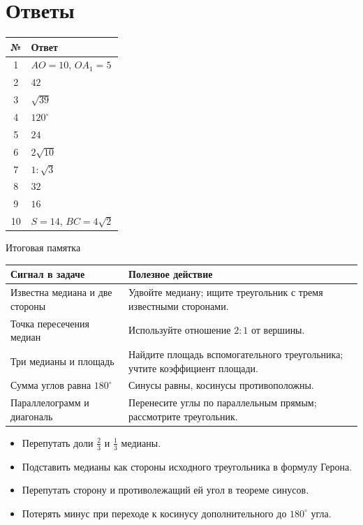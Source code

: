 \documentclass[a4paper,12pt]{article}
\newcommand{\topic}[1]{\par\medskip{\color{darkaccent}\large #1}\par\smallskip}
\begin{document}
\section*{Ответы}
\begin{center}
\renewcommand{\arraystretch}{1.35}
\begin{tabular}{@{}cl@{}}
\toprule
№ & Ответ\\\midrule
1 & $AO=10$, $OA_1=5$\\
2 & $42$\\
3 & $\sqrt{39}$\\
4 & $120^\circ$\\
5 & $24$\\
6 & $2\sqrt{10}$\\
7 & $1:\sqrt3$\\
8 & $32$\\
9 & $16$\\
10 & $S=14$, $BC=4\sqrt2$\\\bottomrule
\end{tabular}
\end{center}
\vspace{5mm}
\begin{center}{\large\color{darkaccent} Итоговая памятка}\end{center}
\renewcommand{\arraystretch}{1.3}
\begin{tabularx}{\linewidth}{@{}p{.43\linewidth}X@{}}
\toprule
Сигнал в задаче & Полезное действие\\\midrule
Известна медиана и две стороны & Удвойте медиану; ищите треугольник с тремя известными сторонами.\\
Точка пересечения медиан & Используйте отношение $2:1$ от вершины.\\
Три медианы и площадь & Найдите площадь вспомогательного треугольника; учтите коэффициент площади.\\
Сумма углов равна $180^\circ$ & Синусы равны, косинусы противоположны.\\
Параллелограмм и диагональ & Перенесите углы по параллельным прямым; рассмотрите треугольник.\\\bottomrule
\end{tabularx}
\topic{Типичные ошибки}
\begin{itemize}
\item Перепутать доли $\frac23$ и $\frac13$ медианы.
\item Подставить медианы как стороны исходного треугольника в формулу Герона.
\item Перепутать сторону и противолежащий ей угол в теореме синусов.
\item Потерять минус при переходе к косинусу дополнительного до $180^\circ$ угла.
\end{itemize}
\end{document}
